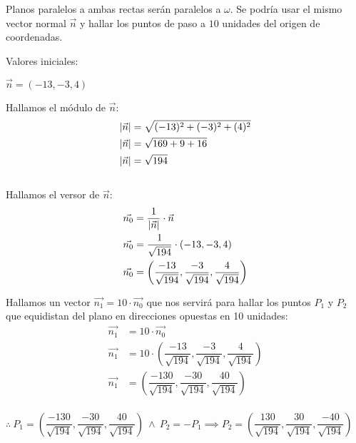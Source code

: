 \noindent Planos paralelos a ambas rectas serán paralelos a $\omega$. Se podría usar el mismo vector normal $\vec{n}$ y hallar los puntos de paso a $10$ unidades del origen de coordenadas.

\noindent Valores iniciales:
\begin{center}
	$\vec{n} = (-13, -3, 4)$
\end{center}

\begin{multicols}{2}
	\noindent Hallamos el módulo de $\vec{n}$:
	\begin{align*}
		\lvert\vec{n}\rvert & = \sqrt{(-13)^2 + (-3)^2 + (4)^2} \\
		\lvert\vec{n}\rvert & = \sqrt{169 + 9 + 16}             \\
		\lvert\vec{n}\rvert & = \sqrt{194}
	\end{align*}
	\columnbreak \\
	\noindent Hallamos el versor de $\vec{n}$:
	\begin{align*}
		\vec{n_0} & = \dfrac{1}{\lvert\vec{n}\rvert} \cdot \vec{n}                                             \\
		\vec{n_0} & = \dfrac{1}{\sqrt{194}} \cdot (-13, -3, 4)                                             \\
		\vec{n_0} & = \left(\dfrac{-13}{\sqrt{194}}, \dfrac{-3}{\sqrt{194}}, \dfrac{4}{\sqrt{194}} \right)
	\end{align*}
\end{multicols}

\noindent Hallamos un vector $\vec{n_1} = 10 \cdot \vec{n_0}$ que nos servirá para hallar los puntos $P_1$ y $P_2$ que equidistan del plano en direcciones opuestas en 10 unidades:
\begin{align*}
	\vec{n_1} & = 10 \cdot \vec{n_0}                                                                           \\
	\vec{n_1} & = 10 \cdot \left(\dfrac{-13}{\sqrt{194}}, \dfrac{-3}{\sqrt{194}}, \dfrac{4}{\sqrt{194}} \right) \\
	\vec{n_1} & = \left(\dfrac{-130}{\sqrt{194}}, \dfrac{-30}{\sqrt{194}}, \dfrac{40}{\sqrt{194}} \right)       \\
\end{align*}
\begin{center}
	$\therefore \ \boxed{P_1 = \left(\dfrac{-130}{\sqrt{194}}, \dfrac{-30}{\sqrt{194}}, \dfrac{40}{\sqrt{194}} \right)}
		\ \land \ P_2 = -P_1 \implies
		\boxed{P_2 = \left(\dfrac{130}{\sqrt{194}}, \dfrac{30}{\sqrt{194}}, \dfrac{-40}{\sqrt{194}} \right)}$
\end{center}

